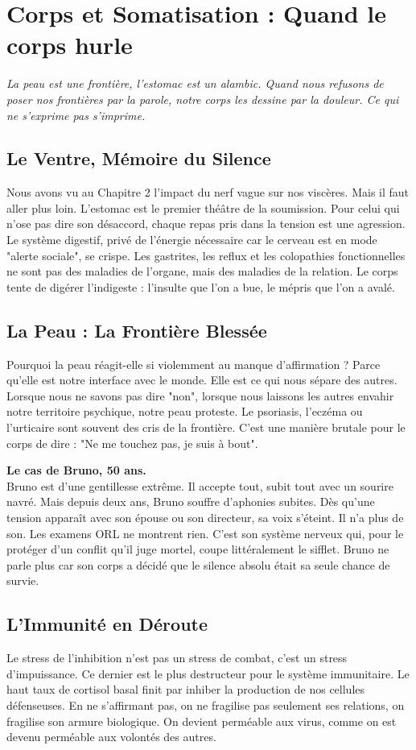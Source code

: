 \chapter{Corps et Somatisation : Quand le corps hurle}

\textit{La peau est une frontière, l'estomac est un alambic. Quand nous refusons de poser nos frontières par la parole, notre corps les dessine par la douleur. Ce qui ne s'exprime pas s'imprime.}

\section{Le Ventre, Mémoire du Silence}
Nous avons vu au Chapitre 2 l'impact du nerf vague sur nos viscères. Mais il faut aller plus loin. L'estomac est le premier théâtre de la soumission. Pour celui qui n'ose pas dire son désaccord, chaque repas pris dans la tension est une agression. Le système digestif, privé de l'énergie nécessaire car le cerveau est en mode "alerte sociale", se crispe. Les gastrites, les reflux et les colopathies fonctionnelles ne sont pas des maladies de l'organe, mais des maladies de la relation. Le corps tente de digérer l'indigeste : l'insulte que l'on a bue, le mépris que l'on a avalé.

\section{La Peau : La Frontière Blessée}
Pourquoi la peau réagit-elle si violemment au manque d'affirmation ? Parce qu'elle est notre interface avec le monde. Elle est ce qui nous sépare des autres. Lorsque nous ne savons pas dire "non", lorsque nous laissons les autres envahir notre territoire psychique, notre peau proteste. Le psoriasis, l'eczéma ou l'urticaire sont souvent des cris de la frontière. C'est une manière brutale pour le corps de dire : "Ne me touchez pas, je suis à bout".

\begin{NoteClinique}
\textbf{Le cas de Bruno, 50 ans.} \\
Bruno est d'une gentillesse extrême. Il accepte tout, subit tout avec un sourire navré. Mais depuis deux ans, Bruno souffre d'aphonies subites. Dès qu'une tension apparaît avec son épouse ou son directeur, sa voix s'éteint. Il n'a plus de son. Les examens ORL ne montrent rien. C'est son système nerveux qui, pour le protéger d'un conflit qu'il juge mortel, coupe littéralement le sifflet. Bruno ne parle plus car son corps a décidé que le silence absolu était sa seule chance de survie.
\end{NoteClinique}

\section{L'Immunité en Déroute}
Le stress de l'inhibition n'est pas un stress de combat, c'est un stress d'impuissance. Ce dernier est le plus destructeur pour le système immunitaire. Le haut taux de cortisol basal finit par inhiber la production de nos cellules défenseuses. En ne s'affirmant pas, on ne fragilise pas seulement ses relations, on fragilise son armure biologique. On devient perméable aux virus, comme on est devenu perméable aux volontés des autres.
